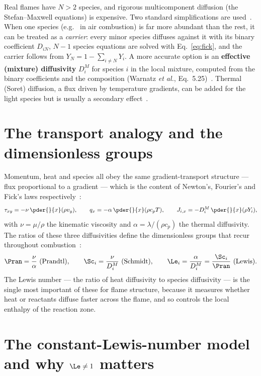 Real flames have $N>2$ species, and rigorous multicomponent diffusion (the Stefan--Maxwell equations) is expensive. Two standard simplifications are used~\cite{lecture8}. When one species (e.g.\  in air combustion) is far more abundant than the rest, it can be treated as a \emph{carrier}: every minor species diffuses against it with its binary coefficient $D_{iN}$, $N-1$ species equations are solved with Eq.~\eqref{eq:fick}, and the carrier follows from $Y_N=1-\sum_{i\ne N}Y_i$. A more accurate option is an \textbf{effective (mixture) diffusivity} $D_i^M$ for species $i$ in the local mixture, computed from the binary coefficients and the composition (Warnatz \emph{et al.}, Eq.~5.25)~\cite{lecture8,warnatz2006combustion}. Thermal (Soret) diffusion, a flux driven by temperature gradients, can be added for the light species but is usually a secondary effect~\cite{warnatz2006combustion}.

\section{The transport analogy and the dimensionless groups}

Momentum, heat and species all obey the same gradient-transport structure --- flux proportional to a gradient --- which is the content of Newton's, Fourier's and Fick's laws respectively~\cite{lecture8}:
\begin{equation}
\tau_{xy}=-\nu\,\pder{}{x}(\rho v_y),\qquad
q_x=-\alpha\,\pder{}{x}(\rho c_p T),\qquad
J_{i,x}=-D_i^M\,\pder{}{x}(\rho Y_i),
\end{equation}
with $\nu=\mu/\rho$ the kinematic viscosity and $\alpha=\lambda/(\rho c_p)$ the thermal diffusivity. The ratios of these three diffusivities define the dimensionless groups that recur throughout combustion~\cite{lecture8,warnatz2006combustion}:
\begin{equation}
\Pran=\frac{\nu}{\alpha}\ \text{(Prandtl)},\qquad
\Sc_i=\frac{\nu}{D_i^M}\ \text{(Schmidt)},\qquad
\Le_i=\frac{\alpha}{D_i^M}=\frac{\Sc_i}{\Pran}\ \text{(Lewis)} .
\label{eq:dimensionless}
\end{equation}
The Lewis number --- the ratio of heat diffusivity to species diffusivity --- is the single most important of these for flame structure, because it measures whether heat or reactants diffuse faster across the flame, and so controls the local enthalpy of the reaction zone.

\section{The constant-Lewis-number model and why $\Le\ne1$ matters}

